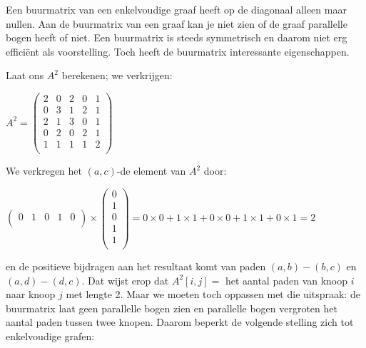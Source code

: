 Een buurmatrix van een enkelvoudige graaf heeft op de
diagonaal alleen maar nullen. Aan de buurmatrix van een graaf kan je niet zien of
de graaf parallelle bogen heeft of niet. Een buurmatrix is
steeds symmetrisch en daarom niet erg effici\"ent als voorstelling. Toch
heeft de buurmatrix interessante eigenschappen.

Laat ons $A^{2}$ berekenen; we verkrijgen:

\begin{center}
$
A^{2} = \left(
\begin{array}{ccccc}
2 & 0 & 2 & 0 & 1\\
0 & 3 & 1 & 2 & 1\\
2 & 1 & 3 & 0 & 1\\
0 & 2 & 0 & 2 & 1\\
1 & 1 & 1 & 1 & 2\\
\end{array}
\right)
$
\end{center}

We verkregen het $(a,c)$-de element van $A^{2}$ door:

\begin{center}
$
\left(
\begin{array}{ccccc}
0 & 1 & 0 & 1 & 0\\
\end{array}
\right)
\times
\left(
\begin{array}{c}
0\\
1\\
0\\
1\\
1\\
\end{array}
\right)
 =
0\times 0 + 1\times 1 + 0\times 0 + 1\times 1 + 0\times 1 = 2$
\end{center}

en de positieve bijdragen aan het resultaat komt van paden $(a,b)-(b,c)$
en $(a,d)-(d,c)$. Dat wijst erop dat $A^{2}[i,j] = $ het aantal paden
van knoop $i$ naar knoop $j$ met lengte 2. Maar we moeten toch
oppassen met die uitspraak: de buurmatrix laat geen parallelle bogen
zien en parallelle bogen vergroten het aantal paden tussen twee knopen.
Daarom beperkt de volgende stelling zich tot enkelvoudige grafen:

